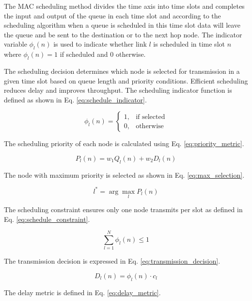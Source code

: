 \documentclass[a4paper,fleqn]{cas-dc}
\numberwithin{equation}{section}
\begin{document}
The MAC scheduling method divides the time axis into time slots and completes the input and output of the queue in each time slot and according to the scheduling algorithm when a queue is scheduled in this time slot data will leave the queue and be sent to the destination or to the next hop node. The indicator variable $\phi_l(n)$ is used to indicate whether link $l$ is scheduled in time slot $n$ where $\phi_l(n)=1$ if scheduled and $0$ otherwise. 

The scheduling decision determines which node is selected for transmission in a given time slot based on queue length and priority conditions. Efficient scheduling reduces delay and improves throughput. The scheduling indicator function is defined as shown in Eq. \ref{eq:schedule_indicator}.

\begin{equation}
\phi_l(n) =
\begin{cases}
1, & \text{if selected} \\
0, & \text{otherwise}
\end{cases}
\label{eq:schedule_indicator}
\end{equation}

The scheduling priority of each node is calculated using Eq. \ref{eq:priority_metric}.

\begin{equation}
P_l(n) = w_1 Q_l(n) + w_2 D_l(n)
\label{eq:priority_metric}
\end{equation}

The node with maximum priority is selected as shown in Eq. \ref{eq:max_selection}.

\begin{equation}
l^* = \arg\max_{l} P_l(n)
\label{eq:max_selection}
\end{equation}

The scheduling constraint ensures only one node transmits per slot as defined in Eq. \ref{eq:schedule_constraint}.

\begin{equation}
\sum_{l=1}^{N} \phi_l(n) \leq 1
\label{eq:schedule_constraint}
\end{equation}

The transmission decision is expressed in Eq. \ref{eq:transmission_decision}.

\begin{equation}
D_l(n) = \phi_l(n) \cdot c_l
\label{eq:transmission_decision}
\end{equation}

The delay metric is defined in Eq. \ref{eq:delay_metric}.
\end{document}

